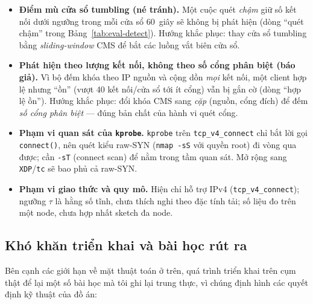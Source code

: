 \begin{itemize}[leftmargin=1.4em]
  \item \textbf{Điểm mù cửa sổ tumbling (né tránh).} Một cuộc quét \emph{chậm}
        giữ số kết nối dưới ngưỡng trong mỗi cửa sổ 60~giây sẽ không bị phát hiện
        (dòng ``quét chậm'' trong Bảng~\ref{tab:eval-detect}). Hướng khắc phục:
        thay cửa sổ tumbling bằng \emph{sliding-window} CMS để bắt các luồng vắt
        biên cửa sổ.
  \item \textbf{Phát hiện theo lượng kết nối, không theo số cổng phân biệt
        (báo giả).} Vì bộ đếm khóa theo IP nguồn và cộng dồn \emph{mọi} kết nối,
        một client hợp lệ nhưng ``ồn'' (vượt 40 kết nối/cửa sổ tới ít cổng) vẫn bị
        gắn cờ (dòng ``hợp lệ ồn''). Hướng khắc phục: đổi khóa CMS sang
        \emph{cặp} (nguồn, cổng đích) để đếm \emph{số cổng phân biệt} --- đúng bản
        chất của hành vi quét cổng.
  \item \textbf{Phạm vi quan sát của \texttt{kprobe}.} \texttt{kprobe} trên
        \texttt{tcp\_v4\_connect} chỉ bắt lời gọi \texttt{connect()}, nên quét
        kiểu raw-SYN (\texttt{nmap -sS} với quyền root) đi vòng qua được; cần
        \texttt{-sT} (connect scan) để nằm trong tầm quan sát. Mở rộng sang
        \texttt{XDP}/\texttt{tc} sẽ bao phủ cả raw-SYN.
  \item \textbf{Phạm vi giao thức và quy mô.} Hiện chỉ hỗ trợ IPv4
        (\texttt{tcp\_v4\_connect}); ngưỡng $\tau$ là hằng số tĩnh, chưa thích
        nghi theo đặc tính tải; số liệu đo trên một node, chưa hợp nhất sketch đa
        node.
\end{itemize}

\subsection{Khó khăn triển khai và bài học rút ra}
\label{subsec:eval-lessons}

Bên cạnh các giới hạn về mặt thuật toán ở trên, quá trình triển khai trên cụm thật để
lại một số bài học mà tôi ghi lại trung thực, vì chúng định hình các quyết định kỹ
thuật của đồ án:

